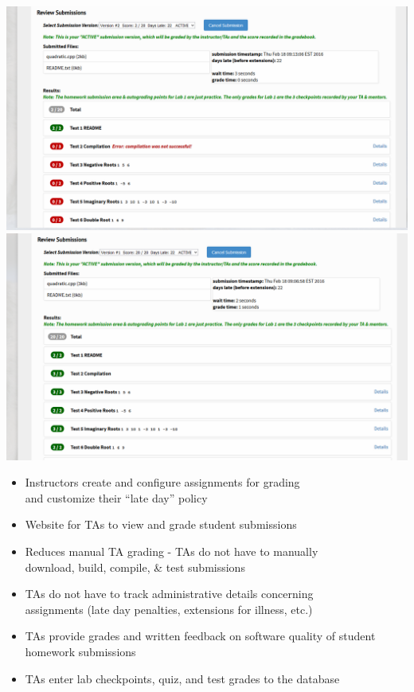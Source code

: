 \documentclass[thesis]{hmcposter}
\begin{document}
\begin{poster}
\begin{center}
\includegraphics[width=5.8in]{CompilationError}%
\hfill
\includegraphics[width=5.8in]{AllCorrect}%
\end{center}




 \begin{itemize}   
    \item Instructors create and configure assignments for grading \\ and
customize their ``late day'' policy
    \item Website for TAs to view and grade student submissions
    \item Reduces manual TA grading - TAs do not have to manually  \\ download, build, compile, \& test submissions
    \item TAs do not have to track administrative details concerning \\ assignments (late day penalties, extensions for illness, etc.)
    \item TAs provide grades and written feedback on software quality of student homework submissions 
    \item TAs enter lab checkpoints, quiz, and test grades to the database
\end{itemize}


\end{poster}
\end{document}
